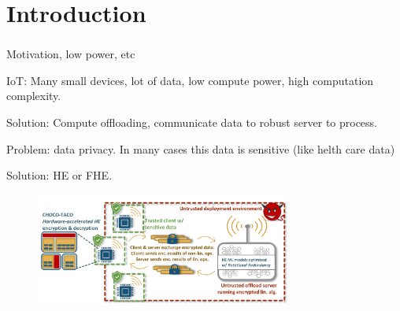 \documentclass[10pt,handout]{beamer}
\begin{document}

\section{Introduction}

\begin{frame}
    \frametitle{}
        Motivation, low power, etc

        IoT: Many small devices, lot of data, low compute power, high computation complexity.

        Solution: Compute offloading, communicate data to robust server to process.

        Problem: data privacy. In many cases this data is sensitive (like helth care data)


        Solution: HE or FHE.
        \begin{figure}
            \includegraphics[width=0.75\textwidth]{model.png}
        \end{figure}


\end{frame}
\end{document}
